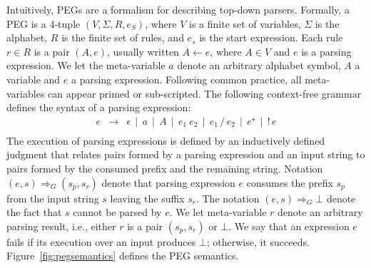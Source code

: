 \documentclass[sigplan,screen]{acmart}
\theoremstyle{definition}
\begin{document}
Intuitively, PEGs are a formalism for describing top-down parsers.
Formally, a PEG is a 4-tuple $(V,\Sigma,R,e_S)$, where $V$ is a
finite set of variables, $\Sigma$ is the alphabet, $R$ is the finite
set of rules, and $e_s$ is the start expression. Each rule $r \in R$ is a
pair $(A,e)$, usually written $A \leftarrow e$, where $A \in V$ and $e$
is a parsing expression. We let the meta-variable $a$ denote an
arbitrary alphabet symbol, $A$ a variable and $e$ a parsing expression.
Following common practice, all meta-variables can appear primed or
sub-scripted. The following context-free grammar defines
the syntax of a parsing expression:
\[
\begin{array}{lcl}
e & \to  & \epsilon \,\mid\, a \,\mid\, A\,\mid\,e_1\:e_2\,
\mid\,e_1\,/\,e_2\,\mid\,e^\star\,\mid\,!\,e\\
\end{array}
\]
The execution of parsing expressions is defined by an inductively defined
judgment that relates pairs formed by a parsing expression and an input string
to pairs formed by the consumed prefix and the remaining string.
Notation $(e,s) \Rightarrow_G (s_p,s_r)$ denote that parsing expression $e$
consumes the prefix $s_p$ from the input string $s$ leaving the suffix $s_r$.
The notation $(e,s) \Rightarrow_G \bot$ denote the fact that $s$ cannot be parsed by
$e$. We let meta-variable $r$ denote an arbitrary parsing result, i.e.,
either $r$ is a pair $(s_p,s_r)$ or $\bot$. We say that an expression $e$
fails if its execution over an input produces $\bot$; otherwise, it succeeds.
Figure~\ref{fig:pegsemantics} defines the PEG semantics.
\end{document}
